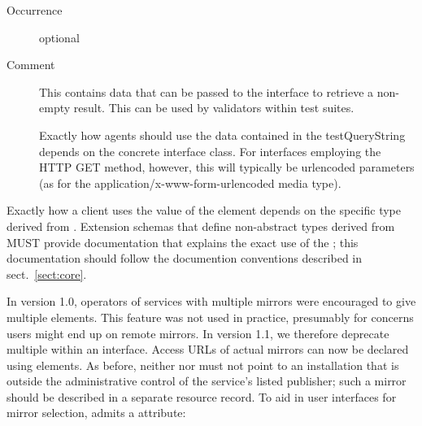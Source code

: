 \documentclass[11pt,a4paper]{ivoa}
\begin{document}
\begin{generated}
\begin{bigdescription}
\begin{description}
\item[Occurrence] optional
\item[Comment] 
                  This contains data that can be passed to the interface to
                  retrieve a non-empty result.  This can be used by validators
                  within test suites.

                  Exactly how agents should use the data contained in
                  the testQueryString depends on the concrete interface class.
                  For interfaces employing the HTTP GET method, however,
                  this will typically be urlencoded parameters (as for
                  the application/x-www-form-urlencoded media type).
               

\end{description}


\end{bigdescription}\endgroup

\endgroup
\end{generated}



Exactly how a client uses the value
of the  element depends on the specific
type derived from .  Extension schemas that
define non-abstract types derived from  MUST
provide documentation that explains the exact use of the
; this documentation should follow the
documention conventions described in sect.~\ref{sect:core}.  

In version 1.0, operators of services with multiple mirrors were
encouraged to give multiple  elements.  This feature
was not used in practice, presumably for concerns users might end up on
remote mirrors.  In version 1.1, we therefore deprecate multiple
 within an interface.  Access URLs of actual mirrors
can now be declared using  elements.
As before, neither 
 nor  must not point to an installation
that is outside the administrative control of the service's listed
publisher; such a mirror should be described in a separate resource
record.  To aid in user interfaces for mirror selection,
 admits a  attribute:
\end{document}
